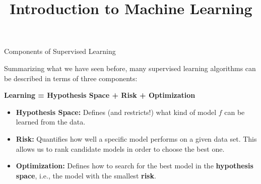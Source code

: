 \documentclass[11pt,compress,t,notes=noshow, xcolor=table]{beamer}
\title{Introduction to Machine Learning}
\institute{\href{https://compstat-lmu.github.io/lecture_i2ml/}{compstat-lmu.github.io/lecture\_i2ml}}
\date{}
\begin{document}


\begin{vbframe}{Components of Supervised Learning}

Summarizing what we have seen before, many supervised learning algorithms 
can be described in terms of three components:

\lz

\begin{center}

  \textbf{Learning = Hypothesis Space + Risk + Optimization}
  
\end{center}

\lz

\begin{itemize}

  \item \textbf{Hypothesis Space:} Defines (and restricts!) what kind of model 
  $f$ can be learned from the data.
  
  \item \textbf{Risk:} Quantifies how well a specific model performs on a given 
  data set. This allows us to rank candidate models in order to choose the best one.
  
  \item \textbf{Optimization:} Defines how to search for the best model in the 
  \textbf{hypothesis space}, i.e., the model with the smallest \textbf{risk}.
  
\end{itemize}

\end{vbframe}

\end{document}
